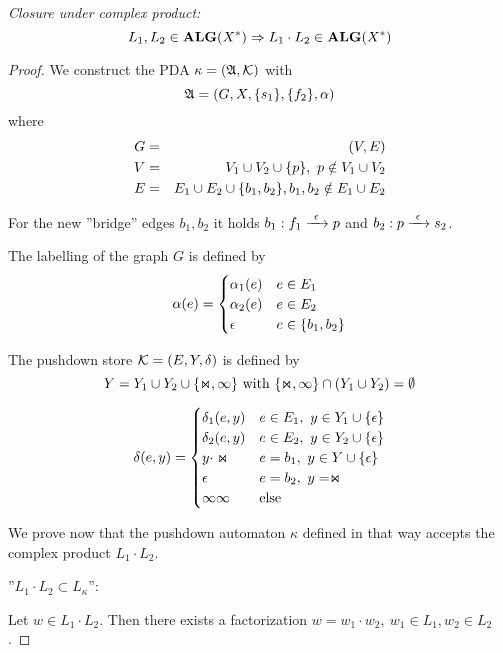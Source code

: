 {\em Closure under complex product:}
\[ L_1, L_2 \in \mbox{{\bf ALG}}(X^*) \Rightarrow L_1 \cdot L_2 \in \mbox{{\bf ALG}}(X^*) \]
\begin{proof}
We construct the PDA $\kappa = (\mbox{$\mathfrak{A}$}, \mbox{$\mathcal{K}$})$ with 
\[\mbox{$\mathfrak{A}$} = (G, X, \mbox{$\{s_1\}$}, \mbox{$\{f_2\}$}, \alpha)\]
where
\begin{eqnarray*}
G &=& (V, E) \\
V &=& V_1 \cup V_2 \cup \mbox{$\{p\}$},\ p \notin V_1 \cup V_2 \\
E &=& E_1 \cup E_2 \cup \mbox{$\{b_1, b_2\}$},b_1, b_2 \notin E_1 \cup E_2
\end{eqnarray*}

For the new ''bridge'' edges $b_1, b_2$ it holds $b_1: f_1 \xrightarrow{\ {\epsilon}\ } p$
and $b_2: p \xrightarrow{\ {\epsilon}\ } s_2$.

The labelling of the graph $G$ is defined by 
\[ \alpha(e) = \begin{cases} 
\alpha_1(e) 	& e \in E_1 \\
\alpha_2(e) 	& e \in E_2 \\
\epsilon 			& e \in \mbox{$\{b_1, b_2\}$} 
\end{cases}\]

\begin{center}

\end{center}

The pushdown store $\mbox{$\mathcal{K}$} = (E, Y, \delta)$ is defined by
\[ Y = Y_1 \cup Y_2 \cup \mbox{$\{\Join, \infty\}$} \text{ with }\mbox{$\{\Join, \infty\}$} \cap
(Y_1 \cup Y_2) = \emptyset \]

\[ \delta(e, y) = \begin{cases}
\delta_1(e, y) 					& e \in E_1,\ y \in Y_1 \cup \mbox{$\{\epsilon\}$} \\
\delta_2(e, y) 					& e \in E_2,\ y \in Y_2 \cup \mbox{$\{\epsilon\}$} \\
y \cdot \Join 					& e = b_1,\ y \in Y \cup \mbox{$\{\epsilon\}$} \\
\epsilon 								& e = b_2,\ y = \Join \\
\infty\infty 						& \text{else}
\end{cases}\]

We prove now that the pushdown automaton $\kappa$ defined in that way accepts
the complex product $L_1 \cdot L_2$.

''$L_1 \cdot L_2 \subset L_{\kappa}$'':

Let $w \in L_1 \cdot L_2$. Then there exists a factorization $w = w_1 \cdot
w_2,\ w_1 \in L_1, w_2 \in L_2$.


\end{proof}
